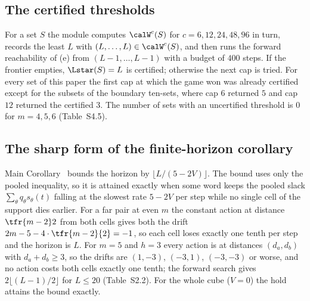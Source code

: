 \subsection{The certified thresholds}
For a set $S$ the module computes $\calW^{c}(S)$ for $c=6,12,24,48,96$ in turn, records the least $L$ with $(L,\dots,L)\in\calW^{c}(S)$, and then runs the forward reachability of (e) from $(L-1,\dots,L-1)$ with a budget of $400$ steps. If the frontier empties, $\Lstar(S)=L$ is certified; otherwise the next cap is tried. For every set of this paper the first cap at which the game won was already certified except for the subsets of the boundary ten-sets, where cap $6$ returned $5$ and cap $12$ returned the certified $3$. The number of sets with an uncertified threshold is $0$ for $m=4,5,6$ (Table~S4.5).

\subsection{The sharp form of the finite-horizon corollary}
Main Corollary~ bounds the horizon by $\lfloor L/(5-2V)\rfloor$. The bound uses only the pooled inequality, so it is attained exactly when some word keeps the pooled slack $\sum_\theta q_\theta s_\theta(t)$ falling at the slowest rate $5-2V$ per step while no single cell of the support dies earlier. For a far pair at even $m$ the constant action at distance $\tfr{m-2}2$ from both cells gives both the drift $2m-5-4\cdot\tfr{m-2}{2}=-1$, so each cell loses exactly one tenth per step and the horizon is $L$. For $m=5$ and $h=3$ every action is at distances $(d_a,d_b)$ with $d_a+d_b\ge3$, so the drifts are $(1,-3)$, $(-3,1)$, $(-3,-3)$ or worse, and no action costs both cells exactly one tenth; the forward search gives $2\lfloor(L-1)/2\rfloor$ for $L\le20$ (Table~S2.2). For the whole cube ($V=0$) the hold attains the bound exactly.

